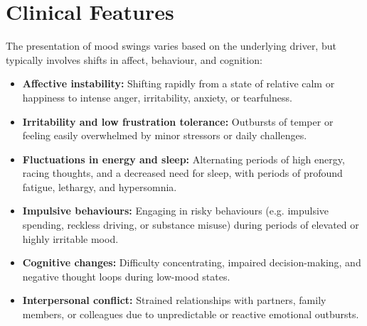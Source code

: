 \section*{Clinical Features}
The presentation of mood swings varies based on the underlying driver, but typically involves shifts in affect, behaviour, and cognition:
\begin{itemize}
    \item \textbf{Affective instability:} Shifting rapidly from a state of relative calm or happiness to intense anger, irritability, anxiety, or tearfulness.
    \item \textbf{Irritability and low frustration tolerance:} Outbursts of temper or feeling easily overwhelmed by minor stressors or daily challenges.
    \item \textbf{Fluctuations in energy and sleep:} Alternating periods of high energy, racing thoughts, and a decreased need for sleep, with periods of profound fatigue, lethargy, and hypersomnia.
    \item \textbf{Impulsive behaviours:} Engaging in risky behaviours (e.g. impulsive spending, reckless driving, or substance misuse) during periods of elevated or highly irritable mood.
    \item \textbf{Cognitive changes:} Difficulty concentrating, impaired decision-making, and negative thought loops during low-mood states.
    \item \textbf{Interpersonal conflict:} Strained relationships with partners, family members, or colleagues due to unpredictable or reactive emotional outbursts.
\end{itemize}

